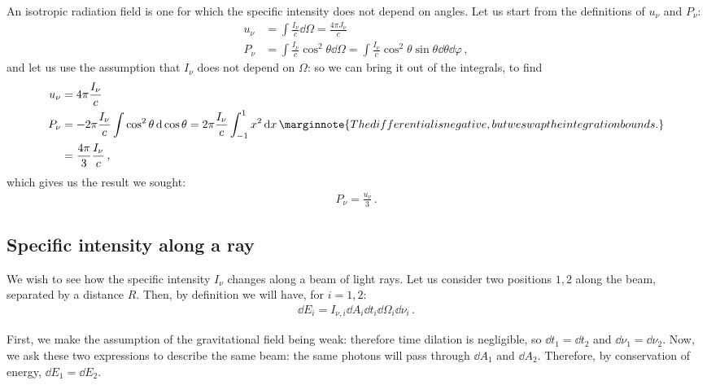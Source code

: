 \documentclass[main.tex]{subfiles}
\begin{document}
An isotropic radiation field is one for which the specific intensity does not depend on angles. 
Let us start from the definitions of \(u_{\nu }\) and \(P_{\nu }\): 
%
\begin{subequations}
\begin{align}
u_{\nu } &= \int \frac{I_{\nu }}{c} \dd{\Omega } = \frac{4 \pi J_{\nu }}{c}  \\
P_{\nu } &= \int  \frac{I_{\nu }}{c}  \cos^2\theta \dd{\Omega } =
\int \frac{I_{\nu }}{c} \cos^2\theta \sin \theta \dd{\theta } \dd{\varphi }
\,,
\end{align}
\end{subequations}
%
and let us use the assumption that \(I_\nu \) does not depend on \(\Omega \): so we can bring it out of the integrals, to find 
%
\begin{subequations}
\begin{align}
u_{\nu } &= 4 \pi  \frac{I_{\nu }}{c}  \\
P_{\nu } &= - 2 \pi  \frac{I_{\nu }}{c} \int \cos^2\theta \dd{\cos \theta } = 2 \pi \frac{I_{\nu }}{c} \int_{-1}^{1} x^2 \dd{x}  \marginnote{The differential is negative, but we swap the integration bounds.}\\
&= \frac{4 \pi }{3} \frac{I_{\nu }}{c}
\,,
\end{align}
\end{subequations}
%
which gives us the result we sought: 
%
\begin{align}
P_{\nu } = \frac{u_{\nu }}{3}
\,.
\end{align}

\subsection{Specific intensity along a ray}

We wish to see how the specific intensity \(I_{\nu }\) changes along a beam of light rays. Let us consider two positions \(1, 2\) along the beam, separated by a distance \(R\). Then, by definition we will have, for \(i =1, 2\):
%
\begin{align}
\dd{E_{i}} = I_{\nu, i} \dd{A_{i}} \dd{t_{i}} \dd{\Omega_{i}} \dd{\nu_{i}}
\,.
\end{align}

First, we make the assumption of the gravitational field being weak: therefore time dilation is negligible, so \(\dd{t_{1}} = \dd{t_2 }\) and \(\dd{\nu_{1}} = \dd{\nu_2 }\). 
Now, we ask these two expressions to describe the same beam: the same photons will pass through \(\dd{A_1 }\) and  \(\dd{A_2 }\).  
Therefore, by conservation of energy, \(\dd{E_1 } = \dd{E_2 }\). 
\end{document}
